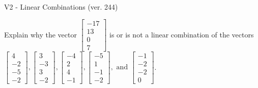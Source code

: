 \begin{exercise}
  \begin{exerciseTitle}V2 - Linear Combinations (ver. 244)\end{exerciseTitle}
  \begin{exerciseStatement}
    Explain why the vector \(\left[\begin{array}{c}
-17 \\
13 \\
0 \\
7
\end{array}\right]\)  is or is not a linear 
	combination of the vectors \(\left[\begin{array}{c}
4 \\
-2 \\
-5 \\
-2
\end{array}\right] , \left[\begin{array}{c}
3 \\
-3 \\
3 \\
-2
\end{array}\right] , \left[\begin{array}{c}
-4 \\
2 \\
4 \\
-1
\end{array}\right] , \left[\begin{array}{c}
-5 \\
1 \\
-1 \\
-2
\end{array}\right] , \text{ and } \left[\begin{array}{c}
-1 \\
-2 \\
-2 \\
0
\end{array}\right]\).
	



\end{exerciseStatement}
\end{exercise}
